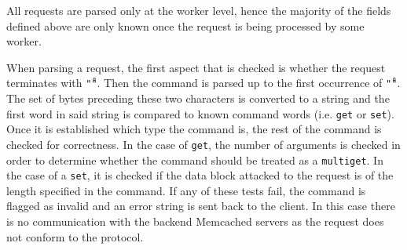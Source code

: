 \documentclass[11pt,a4paper]{article}
\begin{document}
All requests are parsed only at the worker level, hence the majority of the fields defined above are only known once the request is being processed by some worker.

When parsing a request, the first aspect that is checked is whether the request terminates with \texttt{"\r\n"}. Then the command is parsed up to the first occurrence of \texttt{"\r\n"}. The set of bytes preceding these two characters is converted to a string and the first word in said string is compared to known command words (i.e. \texttt{get} or \texttt{set}). Once it is established which type the command is, the rest of the command is checked for correctness. In the case of \texttt{get}, the number of arguments is checked in order to determine whether the command should be treated as a \texttt{multiget}. In the case of a \texttt{set}, it is checked if the data block attacked to the request is of the length specified in the command. If any of these tests fail, the command is flagged as invalid and an error string is sent back to the client. In this case there is no communication with the backend Memcached servers as the request does not conform to the protocol.
\end{document}
